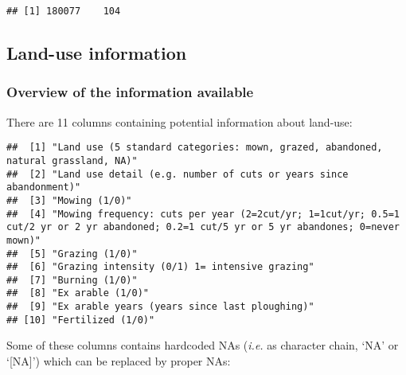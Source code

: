 \documentclass[table]{article}
\newenvironment{Shaded}{\begin{snugshade}}{\end{snugshade}}
\newcommand{\KeywordTok}[1]{\textcolor[rgb]{0.13,0.29,0.53}{\textbf{#1}}}
\newcommand{\DataTypeTok}[1]{\textcolor[rgb]{0.13,0.29,0.53}{#1}}
\newcommand{\DecValTok}[1]{\textcolor[rgb]{0.00,0.00,0.81}{#1}}
\newcommand{\StringTok}[1]{\textcolor[rgb]{0.31,0.60,0.02}{#1}}
\newcommand{\OtherTok}[1]{\textcolor[rgb]{0.56,0.35,0.01}{#1}}
\newcommand{\OperatorTok}[1]{\textcolor[rgb]{0.81,0.36,0.00}{\textbf{#1}}}
\newcommand{\NormalTok}[1]{#1}
\begin{document}
\begin{verbatim}
## [1] 180077    104
\end{verbatim}

\subsection{Land-use information}\label{land-use-information}

\subsubsection{Overview of the information
available}\label{overview-of-the-information-available}

There are 11 columns containing potential information about land-use:

\begin{verbatim}
##  [1] "Land use (5 standard categories: mown, grazed, abandoned, natural grassland, NA)"                                                        
##  [2] "Land use detail (e.g. number of cuts or years since abandonment)"                                                                        
##  [3] "Mowing (1/0)"                                                                                                                            
##  [4] "Mowing frequency: cuts per year (2=2cut/yr; 1=1cut/yr; 0.5=1 cut/2 yr or 2 yr abandoned; 0.2=1 cut/5 yr or 5 yr abandones; 0=never mown)"
##  [5] "Grazing (1/0)"                                                                                                                           
##  [6] "Grazing intensity (0/1) 1= intensive grazing"                                                                                            
##  [7] "Burning (1/0)"                                                                                                                           
##  [8] "Ex arable (1/0)"                                                                                                                         
##  [9] "Ex arable years (years since last ploughing)"                                                                                            
## [10] "Fertilized (1/0)"
\end{verbatim}

Some of these columns contains hardcoded NAs (\emph{i.e.} as character
chain, `NA' or `{[}NA{]}') which can be replaced by proper NAs:

\begin{Shaded}
\end{Shaded}
\end{document}
